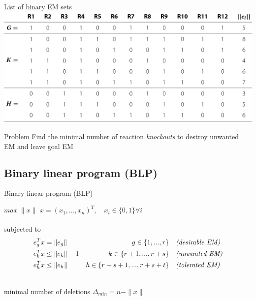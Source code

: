 \documentclass{beamer}
\begin{document}

\begin{frame}{List of binary EM sets}
    \includegraphics[width=\textwidth]{grafik/table1b}
\pause    
    \begin{block}{Problem}
        Find the minimal number of reaction \emph{knockouts} to destroy unwanted EM
        and leave goal EM
    \end{block}
\end{frame}

\subsection{Binary linear program (BLP)}


\begin{frame}{Binary linear program (BLP)}
    
$max ~\|x\|$ \hfill $x = (x_{1}, ..., x_{n})^{T}, \quad x_{i} \in \{0, 1\} \forall i$ \\
~\\
\pause
subjected to  
\begin{align*}
    e^{T}_{g} x & =       \|e_{g}\|      & g \in \{1, ..., r\}     
    & \quad\text{\emph{(desirable EM)}}\\
    e^{T}_{k} x & \leq    \|e_{k}\|-1     & k \in \{r+1, ..., r+s\} 
    & \quad\text{\emph{(unwanted EM)}}\\
    e^{T}_{h} x & \leq    \|e_{h}\|  & h \in \{r+s+1, ..., r+s+t\}
    & \quad\text{\emph{(tolerated EM)}}\\
\end{align*}

\pause
~\\
minimal number of deletions $\Delta_{min} = n - \|x\|$

\end{frame}
\end{document}
